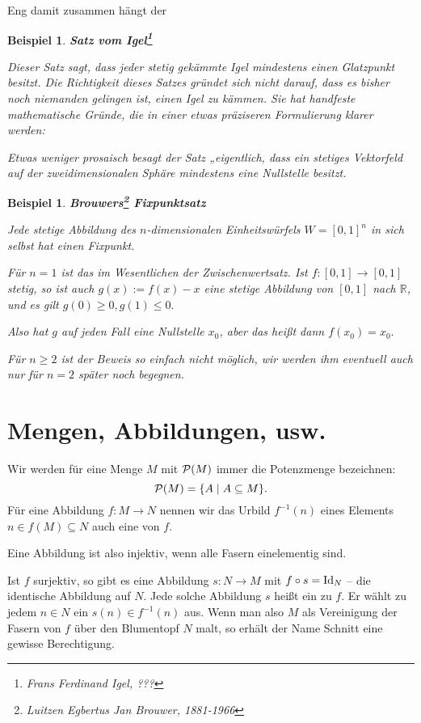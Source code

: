 \documentclass[12pt]{book}   %
\newtheorem{bsp}[alles]{Beispiel}
\begin{document}
Eng damit zusammen hängt der

\begin{bsp} {\bf Satz vom Igel\footnote{Frans Ferdinand Igel, ???}}

{\rm Dieser Satz sagt, dass jeder stetig gekämmte Igel mindestens einen 
Glatzpunkt besitzt. Die Richtigkeit dieses Satzes gründet sich nicht darauf, 
dass es bisher noch niemanden gelingen ist, einen Igel zu kämmen. Sie hat
handfeste mathematische Gründe, die in einer etwas präziseren Formulierung 
klarer werden:

Etwas weniger prosaisch besagt der Satz „eigentlich\grqq, dass ein 
stetiges Vektorfeld auf der zweidimensionalen Sphäre mindestens eine
Nullstelle besitzt.
}
\end{bsp}

\begin{bsp} {\bf Brouwers\footnote{Luitzen Egbertus Jan Brouwer, 1881-1966}
Fixpunktsatz}

{\rm Jede stetige Abbildung des $n$-dimensionalen Einheitswürfels 
$W=[0,1]^n$ in sich selbst hat einen Fixpunkt.

Für $n=1$ ist das im Wesentlichen der Zwischenwertsatz. Ist $f:[0,1]
\longrightarrow [0,1]$ stetig, so ist auch $g(x) := f(x)-x$ eine stetige 
Abbildung von $[0,1]$ nach $\mathbb R$, und es gilt $g(0)\geq 0, g(1)\leq 0.$

Also hat $g$ auf jeden Fall eine Nullstelle $x_0$, aber das heißt dann 
$f(x_0) = x_0.$

Für $n\geq 2$ ist der Beweis so einfach nicht möglich, wir werden ihm 
eventuell auch nur für $n=2$ später noch begegnen.
}
\end{bsp}

\section{Mengen, Abbildungen, usw.}

Wir werden für eine Menge $M$ mit ${\cal P}(M)$ immer die Potenzmenge 
bezeichnen: 
$${\cal P}(M) = \{A \mid A\subseteq M\}.$$
Für eine Abbildung $f:M\longrightarrow N$ nennen wir das Urbild
$f^{-1}(n)$ eines Elements $n\in f(M)\subseteq N$ auch eine 
 von $f.$

Eine Abbildung ist also injektiv, wenn alle Fasern  einelementig sind.

Ist $f$ surjektiv, so gibt es eine Abbildung $s:N\longrightarrow M$ mit
$f\circ s = {\rm Id}_N$ -- die identische Abbildung auf $N.$ Jede solche 
Abbildung $s$ heißt ein  zu $f$. Er wählt zu 
jedem $n\in N$ ein $s(n)\in f^{-1}(n)$ aus. Wenn man also $M$ als Vereinigung
der Fasern von $f$ über den Blumentopf $N$ malt, so erhält der Name Schnitt
eine gewisse Berechtigung.
\end{document}
